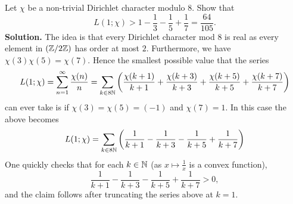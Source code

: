 \documentclass[a4paper,11pt]{article}
\begin{document}
Let $\chi$ be a non-trivial Dirichlet character modulo $8$. Show that 
\begin{equation*}
    L(1; \chi) > 1 - \frac 13 - \frac 15 + \frac 17 = \frac{64}{105}.
\end{equation*}
\textbf{Solution.}
The idea is that every Dirichlet character mod $8$ is real as every element in 
$(\mathbb{Z}/2\mathbb{Z})$ has order at most $2$. Furthermore, we have 
$\chi(3)\chi(5) = \chi(7)$. Hence the smallest possible value that the series
\begin{equation*}
    L(1; \chi) = \sum_{n = 1}^\infty \frac{\chi(n)}n =
    \sum_{k \in 8\mathbb{N} } \left( \frac{\chi(k+1)}{k+1} + 
    \frac{\chi(k+3)}{k+3} + 
    \frac{\chi(k+5)}{k+5} + 
    \frac{\chi(k+7)}{k+7} \right)
\end{equation*}
can ever take is if $\chi(3) = \chi(5) = (-1)$ and $\chi(7) = 1$. In this case the 
above becomes 
\begin{equation*}
    L(1; \chi) =    \sum_{k \in 8\mathbb{N}}\left( \frac{1}{k+1} -
                    \frac{1}{k+3} -
                    \frac{1}{k+5} + 
                    \frac{1}{k+7} \right)
\end{equation*} 
One quickly checks that for each $k \in \mathbb{N}$ (as $x \mapsto \frac1x$ is a convex function), 
\begin{equation*}
    \frac 1{k+1} - 
    \frac 1{k+3} - 
    \frac 1{k+5} +
    \frac 1{k+7}  > 0,
\end{equation*}
and the claim follows after truncating the series above at $k=1$.
\end{document}
